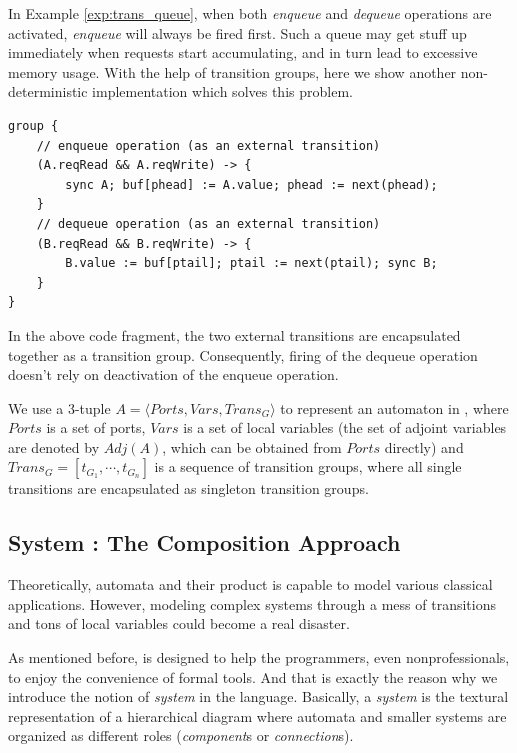 \begin{example} In Example \ref{exp:trans_queue}, when both \emph{enqueue} and \emph{dequeue} operations are activated, \emph{enqueue} will always be fired first. Such a queue may get stuff up immediately when requests start accumulating, and in turn lead to excessive memory usage. With the help of transition groups, here we show another non-deterministic implementation which solves this problem.
\begin{lstlisting}
group {
    // enqueue operation (as an external transition)
    (A.reqRead && A.reqWrite) -> {
        sync A; buf[phead] := A.value; phead := next(phead);
    }
    // dequeue operation (as an external transition)
    (B.reqRead && B.reqWrite) -> {
        B.value := buf[ptail]; ptail := next(ptail); sync B;
    }
}
\end{lstlisting}
In the above code fragment, the two external transitions are encapsulated together as a transition group. Consequently, firing of the dequeue operation doesn't rely on deactivation of the enqueue operation.
\label{exp:transgroup_queue}
\end{example}


We use a 3-tuple $A=\langle Ports, Vars, Trans_G \rangle$ to represent an automaton in \lang{}, where $Ports$ is a set of ports, $Vars$ is a set of local variables (the set of adjoint variables are denoted by $Adj(A)$, which can be obtained from $Ports$ directly) and $Trans_G=[t_{G_1},\cdots,t_{G_n}]$ is a sequence of transition groups, where all single transitions are encapsulated as singleton transition groups.

\subsection{System : The Composition Approach}
\label{subsec:system}

Theoretically, automata and their product is capable to model various classical applications. However, modeling complex systems through a mess of transitions and tons of local variables could become a real disaster.

As mentioned before, \lang{} is designed to help the programmers, even nonprofessionals, to enjoy the convenience of formal tools. And that is exactly the reason why we introduce the notion of \emph{system} in the language. Basically, a \emph{system} is the textural representation of a hierarchical diagram where automata and smaller systems are organized as different roles (\emph{component}s or 
\emph{connection}s). 


